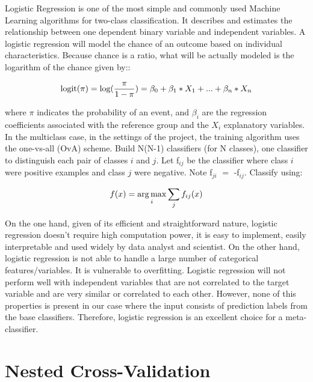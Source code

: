 Logistic Regression is one of the most simple and commonly used Machine Learning algorithms for two-class classification. It describes and estimates the relationship between one dependent binary variable and independent variables. A logistic regression will model the chance of an outcome based on individual characteristics. Because chance is a ratio, what will be actually modeled is the logarithm of the chance given by:: 

\begin{equation}
    \centering
    \text{logit($\pi$)} = \text{log}(\frac{\pi}{1 - \pi}) = \beta_0 + \beta_1 * X_1 + ... + \beta_n * X_n 
\end{equation} 

where $\pi$ indicates the probability of an event, and $\beta_i$ are the regression coefficients associated with the reference group and the $X_i$ explanatory variables. \\

In the multiclass case, in the settings of the project, the training algorithm uses the one-vs-all (OvA) scheme.
Build N(N-1) classifiers (for N classes), one classifier to distinguish each pair of classes $i$ and $j$. Let f$_{ij}$ be the classifier where class $i$ were positive examples and class $j$ were negative. Note f$_{ji}$ $=$ -f$_{ij}$. Classify using:

\begin{equation}
    \centering
    f(x) = \argmax_{i} \sum_{j} f_{ij}(x)
\end{equation} 

On the one hand, given of its efficient and straightforward nature, logistic regression doesn't require high computation power, it is easy to implement, easily interpretable and used widely by data analyst and scientist. On the other hand, logistic regression is not able to handle a large number of categorical features/variables. It is vulnerable to overfitting. Logistic regression will not perform well with independent variables that are not correlated to the target variable and are very similar or correlated to each other. However, none of this properties is present in our case where the input consists of prediction labels from the base classifiers. Therefore, logistic regression is an excellent choice for a meta-classifier. \\

\section{Nested Cross-Validation} \label{nested_cross_validation}

